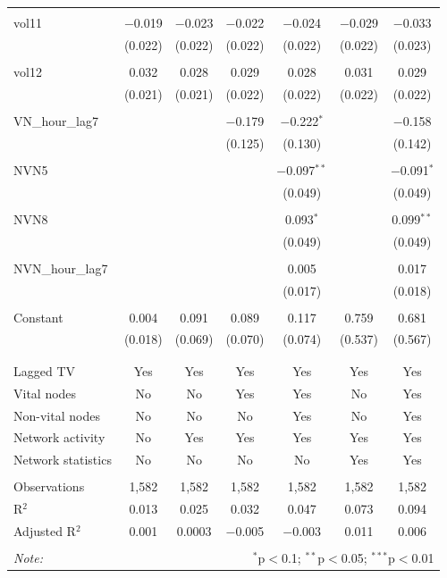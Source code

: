 \begin{table}[!htbp]
\begin{tabular}{@{\extracolsep{5pt}}lcccccc}
  & & & & & & \\ 
 vol11 & $-$0.019 & $-$0.023 & $-$0.022 & $-$0.024 & $-$0.029 & $-$0.033 \\ 
  & (0.022) & (0.022) & (0.022) & (0.022) & (0.022) & (0.023) \\ 
  & & & & & & \\ 
 vol12 & 0.032 & 0.028 & 0.029 & 0.028 & 0.031 & 0.029 \\ 
  & (0.021) & (0.021) & (0.022) & (0.022) & (0.022) & (0.022) \\ 
  & & & & & & \\ 
 VN\_hour\_lag7 &  &  & $-$0.179 & $-$0.222$^{*}$ &  & $-$0.158 \\ 
  &  &  & (0.125) & (0.130) &  & (0.142) \\ 
  & & & & & & \\ 
 NVN5 &  &  &  & $-$0.097$^{**}$ &  & $-$0.091$^{*}$ \\ 
  &  &  &  & (0.049) &  & (0.049) \\ 
  & & & & & & \\ 
 NVN8 &  &  &  & 0.093$^{*}$ &  & 0.099$^{**}$ \\ 
  &  &  &  & (0.049) &  & (0.049) \\ 
  & & & & & & \\ 
 NVN\_hour\_lag7 &  &  &  & 0.005 &  & 0.017 \\ 
  &  &  &  & (0.017) &  & (0.018) \\ 
  & & & & & & \\ 
 Constant & 0.004 & 0.091 & 0.089 & 0.117 & 0.759 & 0.681 \\ 
  & (0.018) & (0.069) & (0.070) & (0.074) & (0.537) & (0.567) \\ 
  & & & & & & \\ 
\hline \\[-1.8ex] 
Lagged TV & Yes & Yes & Yes & Yes & Yes & Yes \\ 
Vital nodes & No & No & Yes & Yes & No & Yes \\ 
Non-vital nodes & No & No & No & Yes & No & Yes \\ 
Network activity & No & Yes & Yes & Yes & Yes & Yes \\ 
Network statistics & No & No & No & No & Yes & Yes \\ 
\hline &  &  &  &  &  &  \\ 
Observations & 1,582 & 1,582 & 1,582 & 1,582 & 1,582 & 1,582 \\ 
R$^{2}$ & 0.013 & 0.025 & 0.032 & 0.047 & 0.073 & 0.094 \\ 
Adjusted R$^{2}$ & 0.001 & 0.0003 & $-$0.005 & $-$0.003 & 0.011 & 0.006 \\ 
\hline 
\hline \\[-1.8ex] 
\textit{Note:}  & \multicolumn{6}{r}{$^{*}$p$<$0.1; $^{**}$p$<$0.05; $^{***}$p$<$0.01} \\ 
\end{tabular} 
\end{table} 
